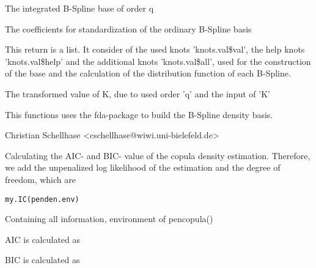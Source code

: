\documentclass[a4paper]{book}
\begin{document}
%
\begin{Value}
\begin{ldescription}
\item[\code{base.den}] The integrated B-Spline base of order q
\item[\code{stand.num}] The coefficients for standardization of the ordinary B-Spline basis
\item[\code{knots.val}] This return is a list. It consider of the used knots 'knots.val\bsl{}\$val', the help knots 'knots.val\bsl{}\$help' and the additional knots 'knots.val\bsl{}\$all', used for the construction of the base and the calculation of the distribution function of each B-Spline.
\item[\code{K}] The transformed value of K, due to used order 'q' and the input of 'K'
\end{ldescription}
\end{Value}
%
\begin{Note}\relax
This functions uses the fda-package to build the B-Spline density basis.
\end{Note}
%
\begin{Author}\relax
Christian Schellhase <cschellhase@wiwi.uni-bielefeld.de>
\end{Author}
%
\begin{Description}\relax
Calculating the AIC- and BIC- value of the copula density estimation. Therefore, we add the unpenalized log likelihood of the estimation and the degree of freedom, which are 	
\end{Description}
%
\begin{Usage}
\begin{verbatim}
my.IC(penden.env)
\end{verbatim}
\end{Usage}
%
\begin{Arguments}
\begin{ldescription}
\item[\code{penden.env}] Containing all information, environment of pencopula()
\end{ldescription}
\end{Arguments}
%
\begin{Details}\relax
AIC is calculated as

BIC is calculated as
\end{Details}
\end{document}
